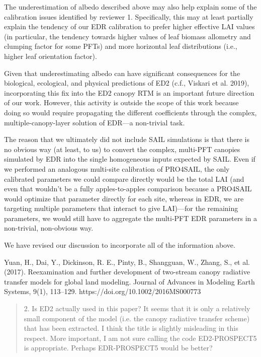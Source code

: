 The underestimation of albedo described above may also help explain some of the calibration issues identified by reviewer 1. Specifically, this may at least partially explain the tendency of our EDR calibration to prefer higher effective LAI values (in particular, the tendency towards higher values of leaf biomass allometry and clumping factor for some PFTs) and more horizontal leaf distributions (i.e., higher leaf orientation factor).

Given that underestimating albedo can have significant consequences for the biological, ecological, and physical predictions of ED2 (c.f., Viskari et al. 2019), incorporating this fix into the ED2 canopy RTM is an important future direction of our work. However, this activity is outside the scope of this work because doing so would require propagating the different coefficients through the complex, multiple-canopy-layer solution of EDR---a non-trivial task.

The reason that we ultimately did not include SAIL simulations is that there is no obvious way (at least, to us) to convert the complex, multi-PFT canopies simulated by EDR into the single homogeneous inputs expected by SAIL. Even if we performed an analogous multi-site calibration of PRO4SAIL, the only calibrated parameters we could compare directly would be the total LAI (and even that wouldn’t be a fully apples-to-apples comparison because a PRO4SAIL would optimize that parameter directly for each site, whereas in EDR, we are targeting multiple parameters that interact to give LAI)---for the remaining parameters, we would still have to aggregate the multi-PFT EDR parameters in a non-trivial, non-obvious way.

We have revised our discussion to incorporate all of the information above.

\medskip
\noindent Yuan, H., Dai, Y., Dickinson, R. E., Pinty, B., Shangguan, W., Zhang, S., et al. (2017). Reexamination and further development of two-stream canopy radiative transfer models for global land modeling. Journal of Advances in Modeling Earth Systems, 9(1), 113–129. https://doi.org/10.1002/2016MS000773


\begin{quote}
  2. Is ED2 actually used in this paper? It seems that it is only a relatively small component of the model (i.e. the canopy radiative transfer scheme) that has been extracted. I think the title is slightly misleading in this respect. More important, I am not sure calling the code ED2-PROSPECT5 is appropriate. Perhaps EDR-PROSPECT5 would be better?
\end{quote}

